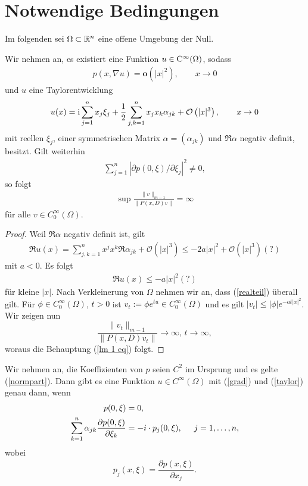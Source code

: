 \section{Notwendige Bedingungen}
Im folgenden sei $\Omega \subset \mathbb R^n$ eine offene Umgebung der Null. 
\begin{lem}
	\label{lem1}
Wir nehmen an, es existiert eine Funktion $u \in \mathrm C^\infty (\Omega)$, sodass 
\begin{align}
\label{grad}
p(x, \nabla u) = \textbf{o} \left(|x|^2\right), \qquad  x \rightarrow 0
\end{align}
und $u$ eine Taylorentwicklung 
\begin{align}
	\label{taylor}
u(x) = \mathrm i \sum_{j=1}^{n} x_j \xi_j + \dfrac{1}{2} \sum_{j,k=1}^{n} x_j x_k \alpha_{jk} + \mathcal O\left( |x|^3 \right), \qquad x\to0
\end{align}
mit reellen $\xi_j$, einer symmetrischen Matrix $\alpha = (\alpha_{jk})$ und $\Re \alpha$ negativ definit, besitzt. Gilt weiterhin  
\begin{align}
\label{normpart}
\sum_{j=1}^{n}|\partial p(0,\xi)/\partial \xi_j|^2 \neq 0,
\end{align}
so folgt
\begin{align}
\label{lm 1 eq}
\sup \frac{ \lVert v \rVert_{m-1} }{ \lVert P(x,D)v \rVert} = \infty
\end{align}
für alle $v \in C_0^\infty(\Omega)$.
\end{lem}
\begin{proof}
Weil $\Re \alpha$ negativ definit ist, gilt\begin{align*}
\Re u(x) = \sum_{j,k=1}^{n} x^jx^k \Re \alpha_{jk} + \mathcal{O}\left( |x|^3 \right) \le -2a |x|^2 + \mathcal{O}\left( |x|^3 \right) (?)
\end{align*}
mit $a<0$. Es folgt
\begin{align}
\label{realteil}
\Re u(x) \le -a |x|^2 (?)
\end{align}
für kleine $|x|$. Nach Verkleinerung von $\Omega$ nehmen wir an, dass (\ref{realteil}) überall gilt. Für $\phi \in C_0^\infty(\Omega)$, $t>0$ ist $v_t := \phi e^{tu} \in C_0^\infty(\Omega)$ und es gilt $|v_t| \le |\phi| e^{-at|x|^2}$. Wir zeigen nun
\[
\frac{\lVert v_t \rVert_{m-1}}{\lVert P(x,D)v_t \rVert} \rightarrow \infty, \, t \rightarrow \infty,
\]
woraus die Behauptung (\ref{lm 1 eq}) folgt.
\end{proof}
\begin{lem}
	\label{lem2}
Wir nehmen an, die Koeffizienten von $p$ seien $C^2$ im Ursprung und es gelte (\ref{normpart}). Dann gibt es eine Funktion $u \in C^\infty(\Omega)$ mit (\ref{grad}) und (\ref{taylor}) genau dann, wenn
\begin{align}
p(0, \xi) &= 0, \\
	\label{4.16}
\sum_{k=1}^{n} \alpha_{jk}\dfrac{\partial p(0,\xi)}{\partial \xi_k} &= -i \cdot p_j(0,\xi), \hspace{0.5cm} j=1, \ldots, n,
\end{align}
wobei
\begin{align}
p_j(x,\xi) = \dfrac{\partial p(x,\xi)}{\partial x_j}.
\end{align}
\end{lem}

